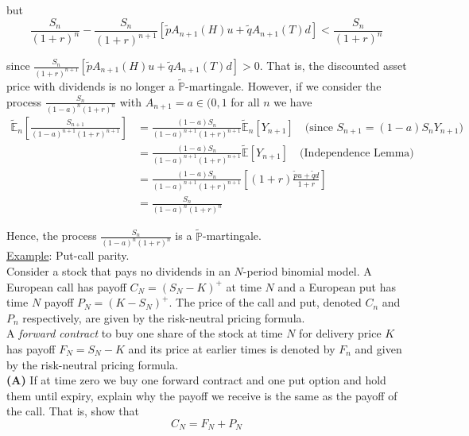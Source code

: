 \documentclass[12pt]{article}
\newlength\tindent
\renewcommand{\indent}{\hspace*{\tindent}}
\renewcommand{\P}{\mathbb P}
\newcommand{\E}{\mathbb E}
\begin{document}
but
\begin{equation*}
	 \frac{S_n}{(1 + r)^n} - \frac{S_n}{(1 + r)^{n + 1}}[\tilde{p}A_{n + 1}(H)u + \tilde{q}A_{n + 1}(T)d] < \frac{S_n}{(1 + r)^n}
\end{equation*}

since $\frac{S_n}{(1 + r)^{n + 1}}[\tilde{p}A_{n + 1}(H)u + \tilde{q}A_{n + 1}(T)d] > 0$. That is, the discounted asset price with dividends is no longer a $\tilde{\P}$-martingale. However, if we consider the process $\frac{S_n}{(1 - a)^n(1 + r)^n}$ with $A_{n + 1} = a \in (0, 1$ for all $n$ we have
\begin{align*}
	\tilde{\E}_n \left[ \frac{S_{n + 1}}{(1 - a)^{n + 1}(1 + r)^{n + 1}} \right] &= \frac{(1 - a)S_n}{(1 - a)^{n + 1}(1 + r)^{n + 1}} \tilde{\E}_n[Y_{n + 1}] \quad \text{(since } S_{n + 1} = (1 - a)S_nY_{n + 1}) \\
	&= \frac{(1 - a)S_n}{(1 - a)^{n + 1}(1 + r)^{n + 1}} \tilde{\E}[Y_{n + 1}] \quad \text{(Independence Lemma)} \\
	&= \frac{(1 - a)S_n}{(1 - a)^{n + 1}(1 + r)^{n + 1}} \left[ (1 + r)\frac{\tilde{p}u + \tilde{q}d}{1 + r} \right] \\
	&= \frac{S_n}{(1 - a)^n(1 + r)^n}
\end{align*}

Hence, the process $\frac{S_n}{(1 - a)^n(1 + r)^n}$ is a $\tilde{\P}$-martingale. \\

\underline{Example}: Put-call parity. \\

\indent Consider a stock that pays no dividends in an $N$-period binomial model. A European call has payoff $C_N = (S_N - K)^+$ at time $N$ and a European put has time $N$ payoff $P_N = (K - S_N)^+$. The price of the call and put, denoted $C_n$ and $P_n$ respectively, are given by the risk-neutral pricing formula. \\

\indent A {\em forward contract} to buy one share of the stock at time $N$ for delivery price $K$ has payoff $F_N = S_N - K$ and its price at earlier times is denoted by $F_n$ and given by the risk-neutral pricing formula. \\

{\bf (A)} If at time zero we buy one forward contract and one put option and hold them until expiry, explain why the payoff we receive is the same as the payoff of the call. That is, show that
\begin{equation*}
	C_N = F_N + P_N
\end{equation*}
\end{document}
